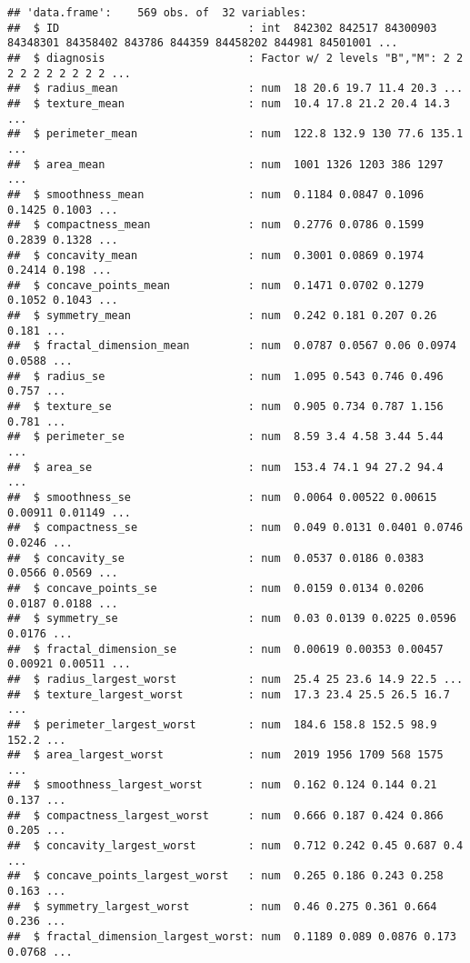 \documentclass[]{article}
\begin{document}
\begin{verbatim}
## 'data.frame':    569 obs. of  32 variables:
##  $ ID                             : int  842302 842517 84300903 84348301 84358402 843786 844359 84458202 844981 84501001 ...
##  $ diagnosis                      : Factor w/ 2 levels "B","M": 2 2 2 2 2 2 2 2 2 2 ...
##  $ radius_mean                    : num  18 20.6 19.7 11.4 20.3 ...
##  $ texture_mean                   : num  10.4 17.8 21.2 20.4 14.3 ...
##  $ perimeter_mean                 : num  122.8 132.9 130 77.6 135.1 ...
##  $ area_mean                      : num  1001 1326 1203 386 1297 ...
##  $ smoothness_mean                : num  0.1184 0.0847 0.1096 0.1425 0.1003 ...
##  $ compactness_mean               : num  0.2776 0.0786 0.1599 0.2839 0.1328 ...
##  $ concavity_mean                 : num  0.3001 0.0869 0.1974 0.2414 0.198 ...
##  $ concave_points_mean            : num  0.1471 0.0702 0.1279 0.1052 0.1043 ...
##  $ symmetry_mean                  : num  0.242 0.181 0.207 0.26 0.181 ...
##  $ fractal_dimension_mean         : num  0.0787 0.0567 0.06 0.0974 0.0588 ...
##  $ radius_se                      : num  1.095 0.543 0.746 0.496 0.757 ...
##  $ texture_se                     : num  0.905 0.734 0.787 1.156 0.781 ...
##  $ perimeter_se                   : num  8.59 3.4 4.58 3.44 5.44 ...
##  $ area_se                        : num  153.4 74.1 94 27.2 94.4 ...
##  $ smoothness_se                  : num  0.0064 0.00522 0.00615 0.00911 0.01149 ...
##  $ compactness_se                 : num  0.049 0.0131 0.0401 0.0746 0.0246 ...
##  $ concavity_se                   : num  0.0537 0.0186 0.0383 0.0566 0.0569 ...
##  $ concave_points_se              : num  0.0159 0.0134 0.0206 0.0187 0.0188 ...
##  $ symmetry_se                    : num  0.03 0.0139 0.0225 0.0596 0.0176 ...
##  $ fractal_dimension_se           : num  0.00619 0.00353 0.00457 0.00921 0.00511 ...
##  $ radius_largest_worst           : num  25.4 25 23.6 14.9 22.5 ...
##  $ texture_largest_worst          : num  17.3 23.4 25.5 26.5 16.7 ...
##  $ perimeter_largest_worst        : num  184.6 158.8 152.5 98.9 152.2 ...
##  $ area_largest_worst             : num  2019 1956 1709 568 1575 ...
##  $ smoothness_largest_worst       : num  0.162 0.124 0.144 0.21 0.137 ...
##  $ compactness_largest_worst      : num  0.666 0.187 0.424 0.866 0.205 ...
##  $ concavity_largest_worst        : num  0.712 0.242 0.45 0.687 0.4 ...
##  $ concave_points_largest_worst   : num  0.265 0.186 0.243 0.258 0.163 ...
##  $ symmetry_largest_worst         : num  0.46 0.275 0.361 0.664 0.236 ...
##  $ fractal_dimension_largest_worst: num  0.1189 0.089 0.0876 0.173 0.0768 ...
\end{verbatim}
\end{document}
